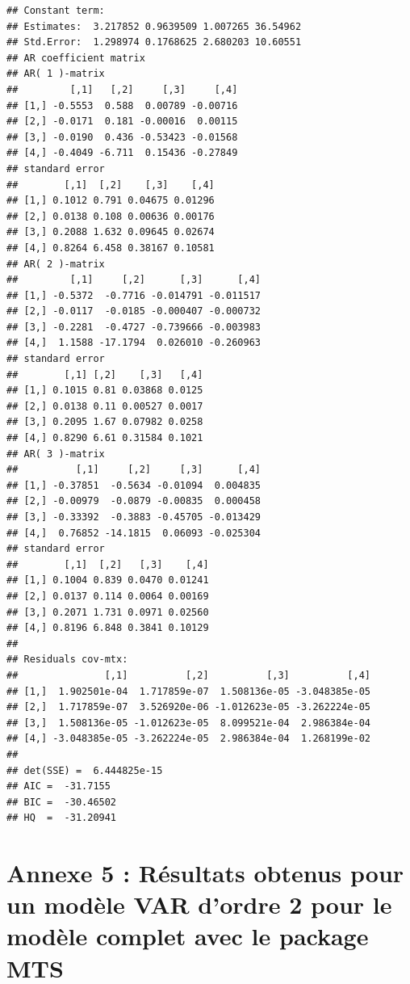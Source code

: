 \documentclass[11pt,]{article}
\begin{document}
\begin{verbatim}
## Constant term: 
## Estimates:  3.217852 0.9639509 1.007265 36.54962 
## Std.Error:  1.298974 0.1768625 2.680203 10.60551 
## AR coefficient matrix 
## AR( 1 )-matrix 
##         [,1]   [,2]     [,3]     [,4]
## [1,] -0.5553  0.588  0.00789 -0.00716
## [2,] -0.0171  0.181 -0.00016  0.00115
## [3,] -0.0190  0.436 -0.53423 -0.01568
## [4,] -0.4049 -6.711  0.15436 -0.27849
## standard error 
##        [,1]  [,2]    [,3]    [,4]
## [1,] 0.1012 0.791 0.04675 0.01296
## [2,] 0.0138 0.108 0.00636 0.00176
## [3,] 0.2088 1.632 0.09645 0.02674
## [4,] 0.8264 6.458 0.38167 0.10581
## AR( 2 )-matrix 
##         [,1]     [,2]      [,3]      [,4]
## [1,] -0.5372  -0.7716 -0.014791 -0.011517
## [2,] -0.0117  -0.0185 -0.000407 -0.000732
## [3,] -0.2281  -0.4727 -0.739666 -0.003983
## [4,]  1.1588 -17.1794  0.026010 -0.260963
## standard error 
##        [,1] [,2]    [,3]   [,4]
## [1,] 0.1015 0.81 0.03868 0.0125
## [2,] 0.0138 0.11 0.00527 0.0017
## [3,] 0.2095 1.67 0.07982 0.0258
## [4,] 0.8290 6.61 0.31584 0.1021
## AR( 3 )-matrix 
##          [,1]     [,2]     [,3]      [,4]
## [1,] -0.37851  -0.5634 -0.01094  0.004835
## [2,] -0.00979  -0.0879 -0.00835  0.000458
## [3,] -0.33392  -0.3883 -0.45705 -0.013429
## [4,]  0.76852 -14.1815  0.06093 -0.025304
## standard error 
##        [,1]  [,2]   [,3]    [,4]
## [1,] 0.1004 0.839 0.0470 0.01241
## [2,] 0.0137 0.114 0.0064 0.00169
## [3,] 0.2071 1.731 0.0971 0.02560
## [4,] 0.8196 6.848 0.3841 0.10129
##   
## Residuals cov-mtx: 
##               [,1]          [,2]          [,3]          [,4]
## [1,]  1.902501e-04  1.717859e-07  1.508136e-05 -3.048385e-05
## [2,]  1.717859e-07  3.526920e-06 -1.012623e-05 -3.262224e-05
## [3,]  1.508136e-05 -1.012623e-05  8.099521e-04  2.986384e-04
## [4,] -3.048385e-05 -3.262224e-05  2.986384e-04  1.268199e-02
##   
## det(SSE) =  6.444825e-15 
## AIC =  -31.7155 
## BIC =  -30.46502 
## HQ  =  -31.20941
\end{verbatim}

\section{\texorpdfstring{Annexe 5 : Résultats obtenus pour un modèle VAR
d'ordre 2 pour le modèle complet avec le package MTS
\label{Annexe5}}{Annexe 5 : Résultats obtenus pour un modèle VAR d'ordre 2 pour le modèle complet avec le package MTS }}\label{annexe-5-resultats-obtenus-pour-un-modele-var-dordre-2-pour-le-modele-complet-avec-le-package-mts}
\end{document}
